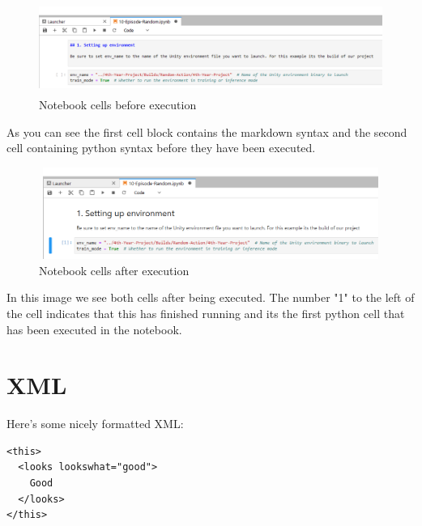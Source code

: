 \begin{figure}[H]
    \centering
    \includegraphics[width=115mm, height=30mm]{img/Notebook1.PNG}
    \caption{Notebook cells before execution}
    \label{fig:sd4}
\end{figure}

\begin{flushleft}
As you can see the first cell block contains the markdown syntax and the second cell containing python syntax before they have been executed.
\end{flushleft}

\begin{figure}[H]
    \centering
    \includegraphics[width=115mm, height=30mm]{img/Notebook2.PNG}
    \caption{Notebook cells after execution}
    \label{fig:sd4}
\end{figure}

\begin{flushleft}
In this image we see both cells after being executed. The number "1" to the left of the cell indicates that this has finished running and its the first python cell that has been executed in the notebook. 
\end{flushleft}


\section{XML}
Here's some nicely formatted XML:
\begin{verbatim}
<this>
  <looks lookswhat="good">
    Good
  </looks>
</this>
\end{verbatim}